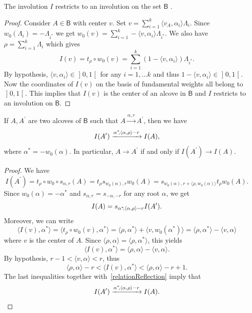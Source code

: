 \documentclass[ALCO,ThmDefs,Unicode,epreuves]{cedram}
\begin{document}
\begin{lemma}
\label{Lem_IonB}The involution $I$ restricts to an involution on the set
$\mathsf{B}$ .
\end{lemma}

\begin{proof}
Consider $A\in\mathsf{B}$ with center $v$. Set $v=\sum_{i=1}^{k}\langle
v_{A},\alpha_{i}\rangle\Lambda_{i}$. Since $w_{0}(\Lambda_{i})=-\Lambda
_{i^{\ast}}$ we get $w_{0}(v)=\sum_{i=1}^{k}-\langle v,\alpha_{i}%
\rangle\Lambda_{i^{\ast}}$. We also have $\rho=\sum_{i=1}^{k}\Lambda_{i}$
which gives
\[
I(v)=t_{\rho}\circ w_{0}(v)=\sum_{i=1}^{k}(1-\langle v,\alpha_{i}%
\rangle)\Lambda_{i^{\ast}}.
\]
By hypothesis, $\langle v,\alpha_{i}\rangle\in\mathopen]0,1\mathclose[$ for any $i=1,\ldots k$
and thus $1-\langle v,\alpha_{i}\rangle\in\mathopen]0,1\mathclose[$. Now the coordinates of
$I(v)$ on the basis of fundamental weights all belong to $\mathopen]0,1\mathclose[$. This implies
that $I(v)$ is the center of an alcove in $\mathsf{B}$ and $I$ restricts to an
involution on $\mathsf{B}$.
\end{proof}

\begin{lemma}
\label{stabilize_without_coeff} If $A,A^{\prime}$ are two alcoves of
$\mathsf{B}$ such that $A\xrightarrow{\alpha,r}A^{\prime}$, then we have
\[
I(A^{\prime})\xrightarrow{\alpha^{*}\mkern-4mu ,\langle \alpha,\rho\rangle-r}I(A),
\]
where $\alpha^{\ast}=-w_{0}(\alpha)$. In particular, $A\rightarrow A^{\prime}$
if and only if $I(A^{\prime})\rightarrow I(A)$.
\end{lemma}

\begin{proof}
We have
\[
I(A^{\prime})=t_{\rho}\circ w_{0}\circ s_{\alpha,r}(A)=t_{\rho}s_{w_{0}%
(\alpha),r}w_{0}(A)=s_{w_{0}(\alpha),r+\langle\rho,w_{0}(\alpha)\rangle
}t_{\rho}w_{0}(A).
\]
Since $w_{0}(\alpha)=-\alpha^{\ast}$ and $s_{\alpha,r}=s_{-\alpha,-r}$ for any
root $\alpha$, we get
\begin{equation}
I(A)=s_{\alpha^{\ast}\mkern-4mu ,\langle\alpha,\rho\rangle-r}I(A^{\prime}).
\label{relationReflection}%
\end{equation}
Moreover, we can write
\[
\langle I(v),\alpha^{\ast}\rangle=\langle t_{\rho}\circ w_{0}(v),\alpha^{\ast
}\rangle=\langle\rho,\alpha^{\ast}\rangle+\langle v,w_{0}(\alpha^{\ast
})\rangle=\langle\rho,\alpha^{\ast}\rangle-\langle v,\alpha\rangle
\]
where $v$ is the center of $A$. Since $\langle\rho,\alpha\rangle=\langle
\rho,\alpha^{\ast}\rangle$, this yields
\[
\langle I(v),\alpha^{\ast}\rangle=\langle\rho,\alpha\rangle-\langle
v,\alpha\rangle.
\]
By hypothesis, $r-1<\langle v,\alpha\rangle<r$, thus
\[
\langle\rho,\alpha\rangle-r<\langle I(v),\alpha^{\ast}\rangle<\langle
\rho,\alpha\rangle-r+1.
\]
The last inequalities together with~\eqref{relationReflection} imply that
\[
I(A^{\prime})\xrightarrow{\alpha^{*}\mkern-4mu ,\langle \alpha,\rho\rangle-r}I(A).\qedhere
\]
\end{proof}
\end{document}
